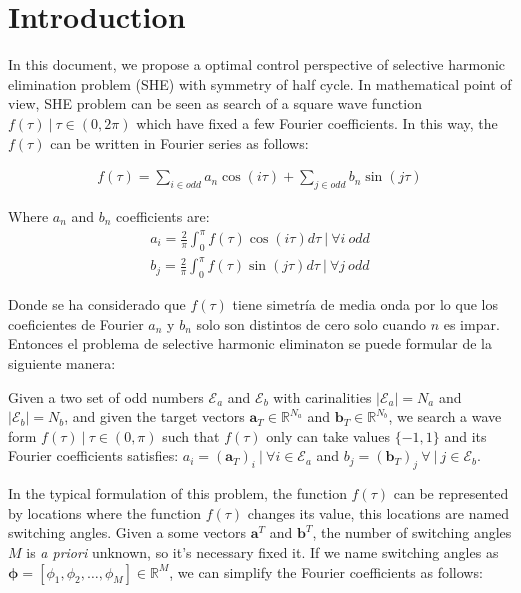 \chapter{Introduction}

In this document, we propose  a optimal control  perspective of selective harmonic elimination problem (SHE) with symmetry of half cycle. 
%
In mathematical point of view, SHE problem can be seen as search of a square wave function  $f(\tau ) \ | \ \tau \in (0,2\pi)$ which have fixed a few Fourier coefficients. 
\newline
%
In this way, the $f(\tau)$ can be written in Fourier series as follows:

\begin{gather}
    f(\tau ) = \sum_{i \in odd} a_n \cos(i\tau)+ \sum_{j \in odd}  b_n \sin(j \tau) 
\end{gather}

Where $a_n$ and $b_n$ coefficients are:
\begin{gather}
    a_i = \frac{2}{\pi} \int_0^\pi f(\tau ) \cos(i \tau)d\tau \ | \ \forall i \ odd \label{an}\\
    b_j = \frac{2}{\pi} \int_0^\pi f(\tau)  \sin(j \tau) d\tau \ | \ \forall j \ odd \label{bn}
\end{gather}


Donde se ha considerado que $f(\tau)$ tiene simetría de media onda por lo que  los coeficientes de Fourier $a_n$ y $b_n$ solo son distintos de cero solo cuando $n$ es impar. Entonces el problema de selective harmonic eliminaton se puede formular de la siguiente manera:

\begin{problem}\label{SHEp}
    Given  a two set of odd numbers $\mathcal{E}_a$ and $\mathcal{E}_b$ with carinalities $|\mathcal{E}_a| = N_a$ and  $|\mathcal{E}_b| = N_b$, and given the target vectors $\bm{a}_T  \in \mathbb{R}^{N_a}$ and $\bm{b}_T  \in \mathbb{R}^{N_b}$, we search a wave form $f(\tau ) \ | \ \tau \in (0,\pi)$ such that $f(\tau)$ only can take values  $\{-1,1\}$ and its Fourier coefficients satisfies: $ a_i = (\bm{a}_T)_i \ | \ \forall i \in \mathcal{E}_a$ and  $b_j = (\bm{b}_T)_j \ \forall \ | \  j \in \mathcal{E}_b$. 
\end{problem}



In the typical formulation of this problem, the function $f(\tau)$ can be represented by locations  where the function $f(\tau)$ changes its value, this locations are named switching angles.
%
Given a some vectors $\bm{a}^T$ and $\bm{b}^T$, the number of switching angles $M$ is \emph{a priori} unknown, so it's necessary fixed it. If we name switching angles as $\bm{\phi} = [\phi_1,\phi_2,\dots,\phi_M] \in \mathbb{R}^M $, we can simplify the Fourier coefficients as follows:

